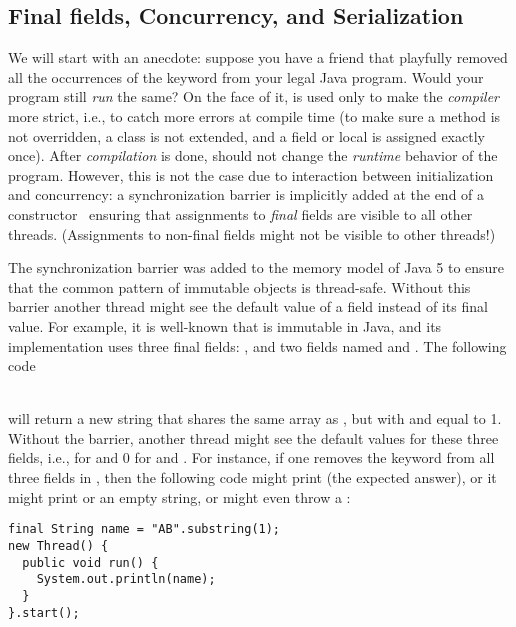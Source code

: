 \subsection{Final fields, Concurrency, and Serialization}
\label{Section:FinalFields}
We will start with an anecdote:
    suppose you have a friend that
    playfully removed all the occurrences of the  keyword
    from your legal Java program.
Would your program still \emph{run} the same?
On the face of it,  is used only to make the \emph{compiler} more {strict},
    i.e., to catch more errors at compile time
    (to make sure a method is not overridden, a class is not extended, and a field or local
        is assigned exactly once).
After \emph{compilation} is done,  should not change the \emph{runtime} behavior of the program.
However, this is not the case due to interaction between initialization and concurrency:
    a synchronization barrier is implicitly added
    at the end of a constructor~\cite{JSR133}
    ensuring that assignments to \emph{final} fields are visible to all other threads.
(Assignments to non-final fields might not be visible to other threads!)

The synchronization barrier was added to the memory model of Java 5
    to ensure that the common pattern of immutable objects is thread-safe.
Without this barrier another thread might see the default value of a field
    instead of its final value.
For example, it is well-known that  is immutable in Java,
    and its implementation uses three {final} fields:
    , and two  fields named  and .
The following code

~~~~~~~~~~\\
will return a new string 
    that shares
    the same  array as , %
    but with  and  equal to 1.
Without the barrier, %
    another thread might see the default values for these three fields,
    i.e.,  for  and 0 for  and .
For instance,
    if one removes the  keyword from all three fields in ,
    then
    the following code might print  (the expected answer),
    or it might print
     or an empty string,
    or might even throw a :
\begin{lstlisting}
final String name = "AB".substring(1);
new Thread() {
  public void run() {
    System.out.println(name);
  }
}.start();
\end{lstlisting}

